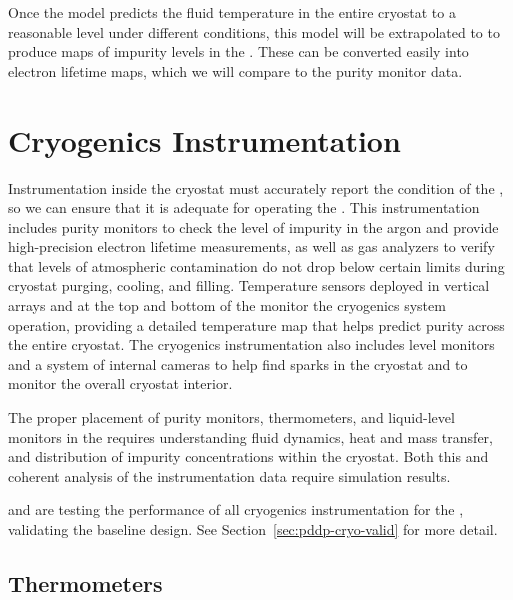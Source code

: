 Once the   model %
predicts the fluid temperature in the entire cryostat to a reasonable level under different conditions, this model will be extrapolated to    
to produce maps of impurity levels in the . These can be converted easily into electron lifetime maps, which we will %
compare to the %
 purity monitor data. 


\section{Cryogenics Instrumentation}
\label{sec:fdgen-cryo-instr}
Instrumentation inside the cryostat must accurately report the condition of the , so we can ensure that it is adequate for operating the .
This instrumentation includes %
purity monitors %
to check the level of impurity in the argon and %
provide high-precision electron lifetime measurements,
as well as gas analyzers to verify that levels of atmospheric contamination do not drop below certain limits during cryostat purging, cooling, and filling. 
Temperature sensors deployed in vertical arrays and at the top and bottom of the  monitor the cryogenics system operation, providing a 
detailed \threed temperature map that helps predict \lar purity across the entire cryostat. The cryogenics instrumentation also includes \lar level monitors and
a system of internal cameras to help find sparks in the cryostat and %
to monitor the overall cryostat interior. 

The proper placement of purity monitors, thermometers, and liquid-level monitors in the  requires %
understanding \lar fluid dynamics, heat and mass transfer, and distribution of impurity concentrations within the cryostat. %
Both this and %
coherent analysis of the instrumentation data require  simulation results.


 and  are testing the performance of all cryogenics instrumentation for the , validating the baseline  %
design. See Section~\ref{sec:pddp-cryo-valid} for more detail. 


\subsection{Thermometers}
\label{sec:fddp-cryo-therm}

